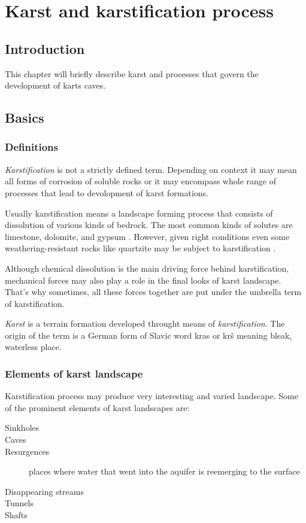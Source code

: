 \chapter{Karst and karstification process}
\section{Introduction}
This chapter will briefly describe karst and processes that govern the
development of karts caves.
\section{Basics}

\subsection{Definitions}
\emph{Karstification} is not a strictly defined term. Depending on context it may
mean all forms of corrosion of soluble rocks or it may encompass whole range of
processes that lead to devolopment of karst formations.

Usually karstification means a landscape forming process that consists of dissolution
of various kinds of bedrock. The most common kinds of solutes are limestone,
dolomite, and gypsum \parencite{karstglossary}. However, given right conditions
even some weathering-resistant rocks like quartzite may be subject to 
karstification \parencite{migon2010}.

Although chemical dissolution is the main driving force behind karstification,
mechanical forces may also play a role in the final looks of karst landscape.
That's why sometimes, all these forces together are put under the umbrella term
of karstification.

\emph{Karst} is a terrain formation developed throught means of
\emph{karstification}. The origin of the term is a German form of Slavic word
kras or krš meaning bleak, waterless place.

\subsection{Elements of karst landscape}

Karstification process may produce very interesting and varied landscape. Some
of the prominent elements of karst landscapes are:

\begin{description}
  \item[Sinkholes]
  \item[Caves]
  \item[Resurgences] places where water that went into the aquifer is 
    reemerging to the surface
  \item[Disappearing streams]
  \item[Tunnels]
  \item[Shafts]
\end{description}

